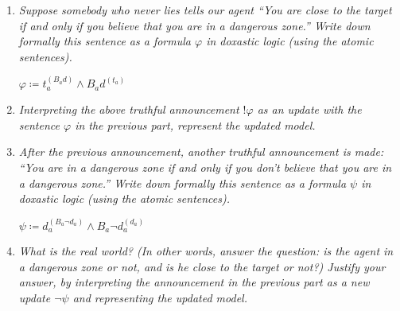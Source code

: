 \documentclass[leqno]{article}
\begin{document}
\begin{enumerate}
    \item \textit{Suppose somebody who never lies tells our agent “You are
    close to the target if and only if you believe that you are in a dangerous
    zone.” Write down formally this sentence as a formula $\varphi$ in doxastic
    logic (using the atomic sentences).}

    $\varphi \coloneqq t_a^{(B_a d)} \wedge B_a d^{(t_a)}$

    \item \textit{Interpreting the above truthful announcement $!\varphi$ as an
    update with the sentence $\varphi$ in the previous part, represent the
    updated model.}

    \begin{center}
    \end{center}

    \item \textit{After the previous announcement, another truthful
    announcement is made: “You are in a dangerous zone if and only if you don’t
    believe that you are in a dangerous zone.” Write down formally this
    sentence as a formula $\psi$ in doxastic logic (using the atomic
    sentences).}

    $\psi \coloneqq d_a^{(B_a \neg d_a)} \wedge B_a \neg d_a^{(d_a)}$

    \item \textit{What is the real world? (In other words, answer the question:
    is the agent in a dangerous zone or not, and is he close to the target or
    not?) Justify your answer, by interpreting the announcement in the previous
    part as a new update $\neg \psi$ and representing the updated model.}


\end{enumerate}
\end{document}
